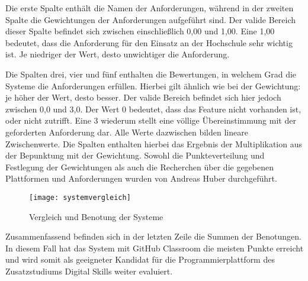 Die erste Spalte enthält die Namen der Anforderungen, während in der zweiten
Spalte die Gewichtungen der Anforderungen aufgeführt sind. Der valide Bereich
dieser Spalte befindet sich zwischen einschließlich 0,00 und 1,00. Eine 1,00
bedeutet, dass die Anforderung für den Einsatz an der Hochschule sehr wichtig
ist. Je niedriger der Wert, desto unwichtiger die Anforderung.

Die Spalten drei, vier und fünf enthalten die Bewertungen, in welchem Grad die
Systeme die Anforderungen erfüllen. Hierbei gilt ähnlich wie bei der Gewichtung:
je höher der Wert, desto besser. Der valide Bereich befindet sich hier jedoch
zwischen 0,0 und 3,0. Der Wert 0 bedeutet, dass das Feature nicht vorhanden ist,
oder nicht zutrifft. Eine 3 wiederum stellt eine völlige Übereinstimmung mit der
geforderten Anforderung dar. Alle Werte dazwischen bilden lineare Zwischenwerte.
Die Spalten enthalten hierbei das Ergebnis der Multiplikation aus der Bepunktung
mit der Gewichtung. Sowohl die Punkteverteilung und Festlegung der Gewichtungen
als auch die Recherchen über die gegebenen Plattformen und Anforderungen wurden
von Andreas Huber durchgeführt.

\begin{figure}[H]
    \centering
    \texttt{[image: systemvergleich]}
    \caption{Vergleich und Benotung der Systeme}
    \label{fig:systemvergleich}
\end{figure}

\newpage

Zusammenfassend befinden sich in der letzten Zeile die Summen der Benotungen. In
diesem Fall hat das System mit GitHub Classroom die meisten Punkte erreicht und
wird somit als geeigneter Kandidat für die Programmierplattform des
Zusatzstudiums Digital Skills weiter evaluiert.
